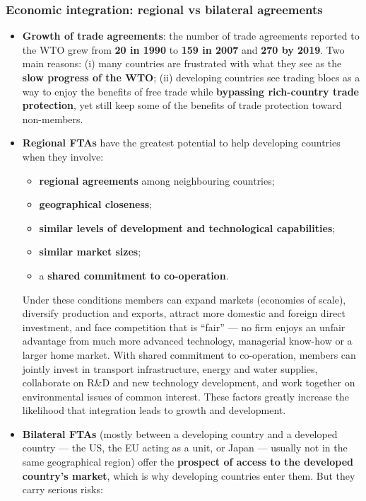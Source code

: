 \subsubsection*{Economic integration: regional vs bilateral agreements}
\begin{itemize}
  \item \textbf{Growth of trade agreements}: the number of trade agreements reported to the WTO grew from \textbf{20 in 1990} to \textbf{159 in 2007} and \textbf{270 by 2019}. Two main reasons: (i) many countries are frustrated with what they see as the \textbf{slow progress of the WTO}; (ii) developing countries see trading blocs as a way to enjoy the benefits of free trade while \textbf{bypassing rich-country trade protection}, yet still keep some of the benefits of trade protection toward non-members.
  \item \textbf{Regional FTAs} have the greatest potential to help developing countries when they involve:
  \begin{itemize}
    \item \textbf{regional agreements} among neighbouring countries;
    \item \textbf{geographical closeness};
    \item \textbf{similar levels of development and technological capabilities};
    \item \textbf{similar market sizes};
    \item a \textbf{shared commitment to co-operation}.
  \end{itemize}
  Under these conditions members can expand markets (economies of scale), diversify production and exports, attract more domestic and foreign direct investment, and face competition that is ``fair'' --- no firm enjoys an unfair advantage from much more advanced technology, managerial know-how or a larger home market. With shared commitment to co-operation, members can jointly invest in transport infrastructure, energy and water supplies, collaborate on R\&D and new technology development, and work together on environmental issues of common interest. These factors greatly increase the likelihood that integration leads to growth and development. 
  \item \textbf{Bilateral FTAs} (mostly between a developing country and a developed country --- the US, the EU acting as a unit, or Japan --- usually not in the same geographical region) offer the \textbf{prospect of access to the developed country's market}, which is why developing countries enter them. But they carry serious risks:

\end{itemize}
